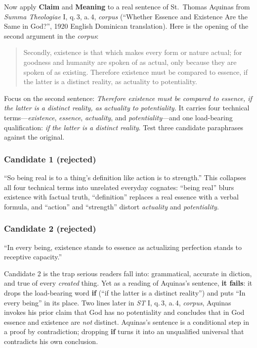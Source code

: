 Now apply \textbf{Claim} and \textbf{Meaning} to a real sentence of St.\ Thomas Aquinas from \emph{Summa Theologiae} I, q.\,3, a.\,4, \emph{corpus} (``Whether Essence and Existence Are the Same in God?'', 1920 English Dominican translation). Here is the opening of the second argument in the \emph{corpus}:

\begin{quote}
Secondly, existence is that which makes every form or nature actual; for goodness and humanity are spoken of as actual, only because they are spoken of as existing. Therefore existence must be compared to essence, if the latter is a distinct reality, as actuality to potentiality.
\end{quote}

Focus on the second sentence: \emph{Therefore existence must be compared to essence, if the latter is a distinct reality, as actuality to potentiality.} It carries four technical terms---\emph{existence}, \emph{essence}, \emph{actuality}, and \emph{potentiality}---and one load-bearing qualification: \emph{if the latter is a distinct reality}. Test three candidate paraphrases against the original.

\subsubsection*{Candidate 1 (rejected)}
``So being real is to a thing's definition like action is to strength.'' This collapses all four technical terms into unrelated everyday cognates: ``being real'' blurs existence with factual truth, ``definition'' replaces a real essence with a verbal formula, and ``action'' and ``strength'' distort \emph{actuality} and \emph{potentiality}.

\subsubsection*{Candidate 2 (rejected)}
``In every being, existence stands to essence as actualizing perfection stands to receptive capacity.''

Candidate 2 is the trap serious readers fall into: grammatical, accurate in diction, and true of every \emph{created} thing. Yet as a reading of Aquinas's sentence, \textbf{it fails}: it drops the load-bearing word \textbf{if} (``if the latter is a distinct reality'') and puts ``In every being'' in its place. Two lines later in \emph{ST} I, q.\,3, a.\,4, \emph{corpus}, Aquinas invokes his prior claim that God has no potentiality and concludes that in God essence and existence are \emph{not} distinct. Aquinas's sentence is a conditional step in a proof by contradiction; dropping \textbf{if} turns it into an unqualified universal that contradicts his own conclusion.


